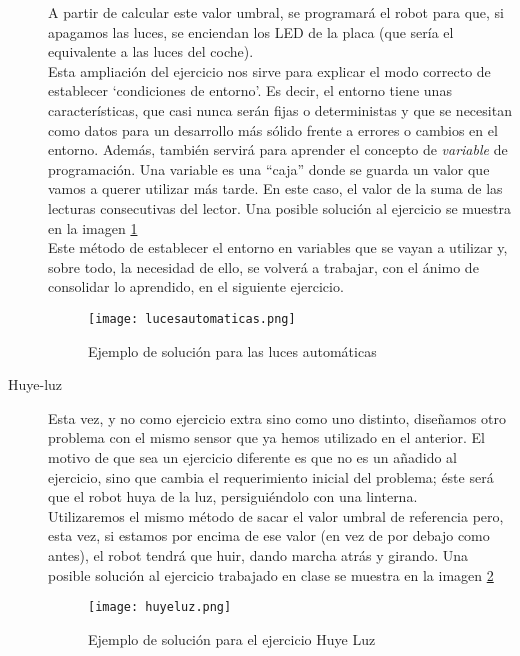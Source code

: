 \begin{description}
A partir de calcular este valor umbral, se programará el robot para que, si apagamos las luces, se enciendan los LED de la placa (que sería el equivalente a las luces del coche).\\
Esta ampliación del ejercicio nos sirve para explicar el modo correcto de establecer `condiciones de entorno'. Es decir, el entorno tiene unas características, que casi nunca serán fijas o deterministas y que se necesitan como datos para un desarrollo más sólido frente a errores o cambios en el entorno. Además, también servirá para aprender el concepto de \textit{variable} de programación. Una variable es una ``caja'' donde se guarda un valor que vamos a querer utilizar más tarde. En este caso, el valor de la suma de las lecturas consecutivas del lector. Una posible solución al ejercicio se muestra en la imagen \ref{img:lucesautomaticas} \\
Este método de establecer el entorno en variables que se vayan a utilizar y, sobre todo, la necesidad de ello, se volverá a trabajar, con el ánimo de consolidar lo aprendido, en el siguiente ejercicio. 
\begin{figure}[h]
	\centering
	\texttt{[image: lucesautomaticas.png]}	
	\caption{Ejemplo de solución para las luces automáticas}
	\label{img:lucesautomaticas}
\end{figure}

\item[Huye-luz]\label{ej:huyeLuz}
Esta vez, y no como ejercicio extra sino como uno distinto, diseñamos otro problema con el mismo sensor que ya hemos utilizado en el anterior. El motivo de que sea un ejercicio diferente es que no es un añadido al ejercicio, sino que cambia el requerimiento inicial del problema; éste será que el robot huya de la luz, persiguiéndolo con una linterna.\\
Utilizaremos el mismo método de sacar el valor umbral de referencia pero, esta vez, si estamos por encima de ese valor (en vez de por debajo como antes), el robot tendrá que huir, dando marcha atrás y girando. Una posible solución al ejercicio trabajado en clase se muestra en la imagen \ref{img:huyeluz}\\

\begin{figure}[h]
	\centering
	\texttt{[image: huyeluz.png]}	
	\caption{Ejemplo de solución para el ejercicio Huye Luz}
	\label{img:huyeluz}
\end{figure}


\end{description}
